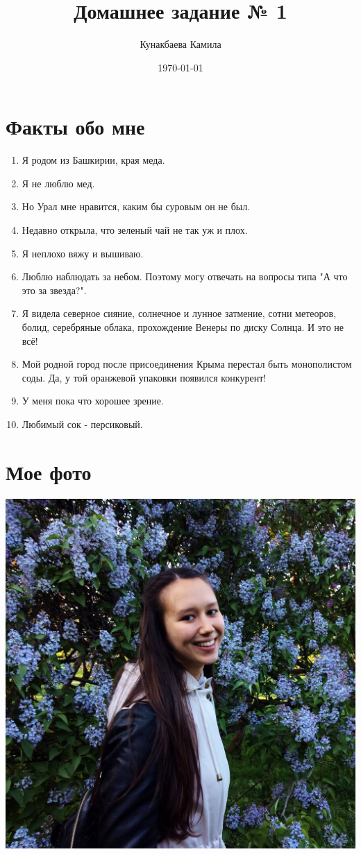 \documentclass[12pt, a4paper]{article}
\author{Кунакбаева Камила}
\title{Домашнее задание № 1}
\date{\today}
\begin{document}
\maketitle

\section{Факты обо мне}

\begin{enumerate}
\item Я родом из Башкирии, края меда.
\item Я не люблю мед.
\item Но Урал мне нравится, каким бы суровым он не был.
\item Недавно открыла, что зеленый чай не так уж и плох.
\item Я неплохо вяжу и вышиваю.
\item Люблю наблюдать за небом. Поэтому могу отвечать на вопросы типа "А что это за звезда?".
\item Я видела северное сияние, солнечное и лунное затмение, сотни метеоров, болид, серебряные облака, прохождение Венеры по диску Солнца. И это не всё!
\item Мой родной город после присоединения Крыма перестал быть монополистом соды. Да, у той оранжевой упаковки появился конкурент!
\item У меня пока что хорошее зрение. 
\item Любимый сок - персиковый.
\end{enumerate}


\section{Мое фото}

\includegraphics[scale=0.13]{Kam.jpg}
\end{document}
